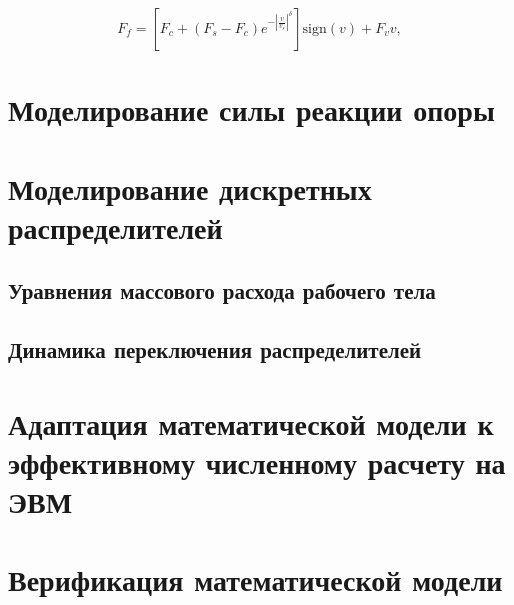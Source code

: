 \begin{equation}
F_f = \left[F_c + (F_s - F_c)e^{-\left|\frac{v}{v_s}\right|^\delta}\right]\text{sign}(v) + F_v v,
\end{equation}

\section{Моделирование силы реакции опоры}\label{sec:ch2/sec2/subsec5}

\section{Моделирование дискретных распределителей}\label{sec:ch2/sec3}

\subsection{Уравнения массового расхода рабочего тела}\label{sec:ch2/sec3/subsec1}

\subsection{Динамика переключения распределителей}\label{sec:ch2/sec3/subsec2}


\section{Адаптация математической модели к эффективному численному расчету на ЭВМ}\label{sec:ch2/sec5}

\section{Верификация математической модели}\label{sec:ch2/sec6}
